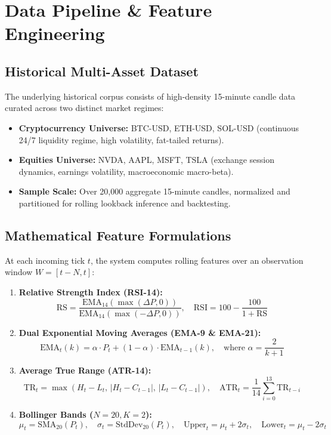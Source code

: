 \documentclass[11pt,a4paper]{article}
\begin{document}
\section{Data Pipeline \& Feature Engineering}

\subsection{Historical Multi-Asset Dataset}
The underlying historical corpus consists of high-density 15-minute candle data curated across two distinct market regimes:
\begin{itemize}[leftmargin=1.5em]
  \item \textbf{Cryptocurrency Universe:} BTC-USD, ETH-USD, SOL-USD (continuous 24/7 liquidity regime, high volatility, fat-tailed returns).
  \item \textbf{Equities Universe:} NVDA, AAPL, MSFT, TSLA (exchange session dynamics, earnings volatility, macroeconomic macro-beta).
  \item \textbf{Sample Scale:} Over 20,000 aggregate 15-minute candles, normalized and partitioned for rolling lookback inference and backtesting.
\end{itemize}

\subsection{Mathematical Feature Formulations}
At each incoming tick $t$, the system computes rolling features over an observation window $W = [t-N, t]$:
\begin{enumerate}[leftmargin=1.5em]
  \item \textbf{Relative Strength Index (RSI-14):}
  $$\text{RS} = \frac{\text{EMA}_{14}(\max(\Delta P, 0))}{\text{EMA}_{14}(\max(-\Delta P, 0))}, \quad \text{RSI} = 100 - \frac{100}{1 + \text{RS}}$$
  \item \textbf{Dual Exponential Moving Averages (EMA-9 \& EMA-21):}
  $$\text{EMA}_t(k) = \alpha \cdot P_t + (1 - \alpha) \cdot \text{EMA}_{t-1}(k), \quad \text{where } \alpha = \frac{2}{k+1}$$
  \item \textbf{Average True Range (ATR-14):}
  $$\text{TR}_t = \max \left( H_t - L_t, \, |H_t - C_{t-1}|, \, |L_t - C_{t-1}| \right), \quad \text{ATR}_t = \frac{1}{14} \sum_{i=0}^{13} \text{TR}_{t-i}$$
  \item \textbf{Bollinger Bands ($N=20, K=2$):}
  $$\mu_t = \text{SMA}_{20}(P_t), \quad \sigma_t = \text{StdDev}_{20}(P_t), \quad \text{Upper}_t = \mu_t + 2\sigma_t, \quad \text{Lower}_t = \mu_t - 2\sigma_t$$
\end{enumerate}
\end{document}

